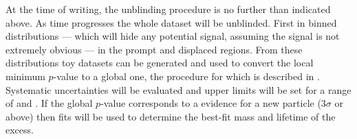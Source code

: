 At the time of writing, the unblinding procedure is no further than indicated above.
As time progresses the whole dataset will be unblinded.
First in binned distributions
--- which will hide any potential signal, assuming the signal is not extremely obvious ---
in the prompt and displaced regions.
From these distributions toy datasets can be generated and used to convert the local minimum
$p$-value to a global one, the procedure for which is described in .
Systematic uncertainties will be evaluated and upper limits will be set for a range of \mass{\db}
and \lifetime{\db}.
If the global $p$-value corresponds to a evidence for a new particle
($3\sigma$ or above) then fits will be used to
determine the best-fit mass and lifetime of the excess.





